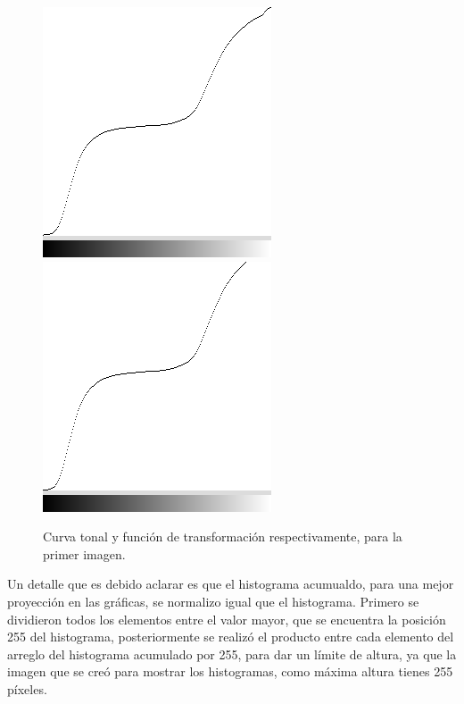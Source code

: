 \documentclass[conference]{IEEEtran}
\begin{document}
\begin{figure}[h]
	\begin{center}
		\setlength{\unitlength}{0.00105in}
		\includegraphics[scale=0.50]{./images/Ha3_1.png}
		\includegraphics[scale=0.50]{./images/Ha3_2.png}
	\end{center}
	\caption{Curva tonal y funci\'on de transformaci\'on respectivamente, para la primer imagen.}
\end{figure}

Un detalle que es debido aclarar es que el histograma acumualdo, para una mejor proyecci\'on en las gr\'aficas, se normalizo igual que el histograma. Primero se dividieron todos los elementos entre el valor mayor, que se encuentra la posici\'on 255 del histograma, posteriormente se realiz\'o el producto entre cada elemento del arreglo del histograma acumulado por 255, para dar un l\'imite de altura, ya que la imagen que se cre\'o para mostrar los histogramas, como m\'axima altura tienes 255 p\'ixeles.\\\\
\end{document}
